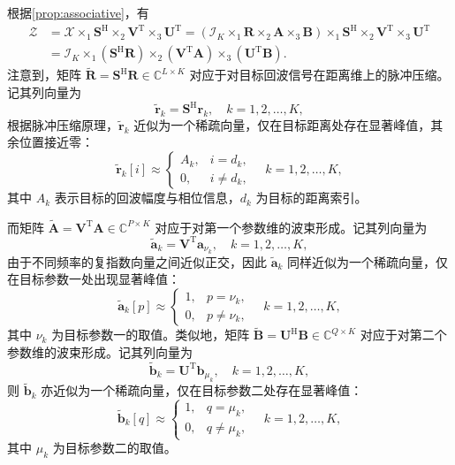 根据\cref{prop:associative}，有
\[
    \begin{split}
        \mathcal{Z}
         & = \mathcal{X} \times_1 \mathbf{S}^{\mathrm{H}} \times_2 \mathbf{V}^{\mathrm{T}} \times_3 \mathbf{U}^{\mathrm{T}}
        = \left( \mathcal{I}_K \times_1 \mathbf{R} \times_2 \mathbf{A} \times_3 \mathbf{B} \right)
        \times_1 \mathbf{S}^{\mathrm{H}} \times_2 \mathbf{V}^{\mathrm{T}} \times_3 \mathbf{U}^{\mathrm{T}}                  \\
         & = \mathcal{I}_K \times_1 \left( \mathbf{S}^{\mathrm{H}} \mathbf{R} \right)
        \times_2 \left( \mathbf{V}^{\mathrm{T}} \mathbf{A} \right)
        \times_3 \left( \mathbf{U}^{\mathrm{T}} \mathbf{B} \right).
    \end{split}
\]
注意到，矩阵 \( \tilde{\mathbf{R}} = \mathbf{S}^{\mathrm{H}} \mathbf{R} \in \mathbb{C}^{L \times K} \) 对应于对目标回波信号在距离维上的脉冲压缩。记其列向量为
\[
    \tilde{\bm{r}}_k = \mathbf{S}^{\mathrm{H}} \bm{r}_k,
    \quad k=1,2,\dots,K,
\]
根据脉冲压缩原理，\( \tilde{\bm{r}}_k \) 近似为一个稀疏向量，仅在目标距离处存在显著峰值，其余位置接近零：
\[
    \tilde{\bm{r}}_k[i] \approx
    \begin{cases}
        A_k, & i = d_k,    \\
        0,   & i \neq d_k,
    \end{cases}
    \quad k=1,2,\dots,K,
\]
其中 \( A_k \) 表示目标的回波幅度与相位信息，\( d_k \) 为目标的距离索引。

而矩阵 \( \tilde{\mathbf{A}} =  \mathbf{V}^{\mathrm{T}} \mathbf{A} \in \mathbb{C}^{P \times K} \) 对应于对第一个参数维的波束形成。记其列向量为
\[
    \tilde{\bm{a}}_k = \mathbf{V}^{\mathrm{T}} \bm{a}_{\nu_k},
    \quad k=1,2,\dots,K,
\]
由于不同频率的复指数向量之间近似正交，因此 \( \tilde{\bm{a}}_k \) 同样近似为一个稀疏向量，仅在目标参数一处出现显著峰值：
\[
    \tilde{\bm{a}}_k[p] \approx
    \begin{cases}
        1, & p = \nu_k,    \\
        0, & p \neq \nu_k,
    \end{cases}
    \quad k=1,2,\dots,K,
\]
其中 \( \nu_k \) 为目标参数一的取值。类似地，矩阵 \(  \tilde{\mathbf{B}} = \mathbf{U}^{\mathrm{H}} \mathbf{B} \in \mathbb{C}^{Q \times K} \) 对应于对第二个参数维的波束形成。记其列向量为
\[
    \tilde{\bm{b}}_k = \mathbf{U}^{\mathrm{T}} \bm{b}_{\mu_k},
    \quad k=1,2,\dots,K,
\]
则 \( \tilde{\bm{b}}_k \) 亦近似为一个稀疏向量，仅在目标参数二处存在显著峰值：
\[
    \tilde{\bm{b}}_k[q] \approx
    \begin{cases}
        1, & q = \mu_k,    \\
        0, & q \neq \mu_k,
    \end{cases}
    \quad k=1,2,\dots,K,
\]
其中 \( \mu_k \) 为目标参数二的取值。

